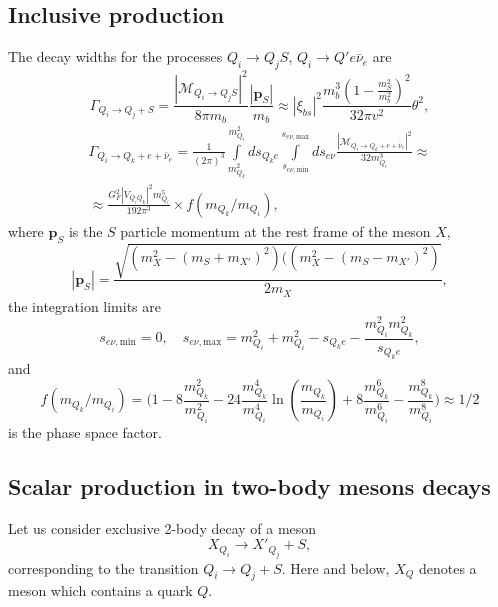 \documentclass[a4paper,12pt,dvipsnames,usernames]{article}
\begin{document}
\subsection{Inclusive production}
\label{sec:inclusive-br-calculation}
The decay widths for the processes $Q_{i}\to Q_{j}S$, $Q_{i}\to Q'e\bar{\nu}_{e}$ are
\begin{equation}
    \Gamma_{Q_{i}\to Q_{j} +S} = \frac{|\mathcal{M}_{Q_{i}\to Q_{j}S}|^{2}}{8\pi m_{b}}\frac{|\bm{p}_{S}|}{m_{b}} \approx |\xi_{bs}|^{2}\frac{m_{b}^{3}\left(1-\frac{m_{S}^{2}}{m_{b}^{2}} \right)^{2}}{32 \pi v^{2}}\theta^{2},
\end{equation}
\begin{multline}
    \Gamma_{Q_{i}\to Q_{k} +e+\bar{\nu}_{e}} = \frac{1}{(2\pi)^{3}}\int \limits_{m_{Q_{k}}^{2}}^{m_{Q_{i}}^{2}}ds_{Q_{k}e} \int \limits_{s_{e\nu,\text{min}}}^{s_{e\nu,\text{max}}} ds_{e\nu} \frac{|\mathcal{M}_{Q_{i}\to Q_{k}+e+\bar{\nu}_{e}}|^{2}}{32m_{Q_{i}}^{3}} \approx \\ \approx
    \frac{G_{F}^{2}|V_{Q_{i}Q_{k}}|^{2}m_{Q_{i}}^{5}}{192\pi^{3}}\times f(m_{Q_{k}}/m_{Q_{i}}),
\end{multline}
where $\bm{p}_{S}$ is the $S$ particle momentum at the rest frame of the meson $X$,
\begin{equation}
    |\bm{p}_{S}| = \frac{\sqrt{(m_{X}^{2}-(m_{S}+m_{X'})^{2})((m_{X}^{2}-(m_{S}-m_{X'})^{2})}}{2m_{X}},
\end{equation}
the integration limits are
\begin{equation}
s_{e\nu,\text{min}} = 0, \quad s_{e\nu,\text{max}}= m_{Q_{i}}^{2}+m_{Q_{i}}^{2}-s_{Q_{k}e}-\frac{m_{Q_{i}}^{2}m_{Q_{k}}^{2}}{s_{Q_{k}e}},
\end{equation}
and
\begin{equation}
    f(m_{Q_{k}}/m_{Q_{i}}) = \bigg(1-8\frac{m_{Q_{k}}^{2}}{m_{Q_{i}}^{2}}-24\frac{m_{Q_{k}}^{4}}{m_{Q_{i}}^{4}}\ln\left(\frac{m_{Q_{k}}}{m_{Q_{i}}}\right)+8\frac{m_{Q_{k}}^{6}}{m_{Q_{i}}^{6}}-\frac{m_{Q_{k}}^{8}}{m_{Q_{i}}^{8}} \bigg) \approx 1/2
\end{equation}
is the phase space factor.

\subsection{Scalar production in two-body mesons decays}
\label{sec:meson-two-body-decays}

Let us consider exclusive 2-body decay of a meson
\begin{equation}
    X_{Q_i}\to X'_{Q_j} +S,
\label{eq:exclusive-process}
\end{equation}
corresponding to the transition $Q_{i} \to Q_{j}+S$. Here and below, $X_{Q}$ denotes a meson which contains a quark $Q$.
\end{document}
